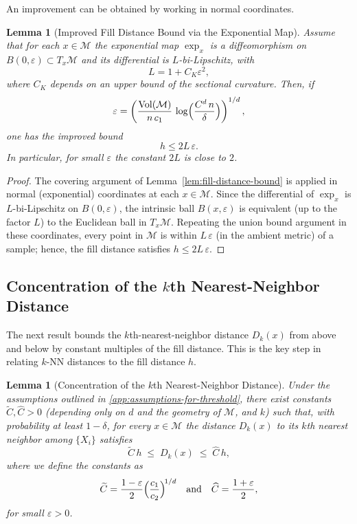 \documentclass{article}
\theoremstyle{plain}
\newtheorem{lemma}[theorem]{Lemma}
\theoremstyle{definition}
\theoremstyle{remark}
\begin{document}
\medskip

An improvement can be obtained by working in normal coordinates.

\begin{lemma}[Improved Fill Distance Bound via the Exponential Map]\label{lem:fill-distance-bound-improved}
Assume that for each \(x\in \mathcal{M}\) the exponential map \(\exp_x\) is a diffeomorphism on \(B(0,\varepsilon)\subset T_x\mathcal{M}\) and its differential is \(L\)-bi-Lipschitz, with 
\[
L = 1+C_K\varepsilon^2,
\]
where \(C_K\) depends on an upper bound of the sectional curvature. Then, if 
\[
\varepsilon = \left(\frac{\operatorname{Vol}(\mathcal{M})}{n\,c_1}\,\log\Bigl(\frac{C^d\,n}{\delta}\Bigr)\right)^{1/d},
\]
one has the improved bound
\begin{equation}\label{eq:fill-distance-bound-improved}
h \le 2L\,\varepsilon.
\end{equation}
In particular, for small \(\varepsilon\) the constant \(2L\) is close to \(2\).
\end{lemma}

\begin{proof}
The covering argument of Lemma~\ref{lem:fill-distance-bound} is applied in normal (exponential) coordinates at each \(x\in \mathcal{M}\). Since the differential of \(\exp_x\) is \(L\)-bi-Lipschitz on \(B(0,\varepsilon)\), the intrinsic ball \(B(x,\varepsilon)\) is equivalent (up to the factor \(L\)) to the Euclidean ball in \(T_x\mathcal{M}\). Repeating the union bound argument in these coordinates, every point in \(\mathcal{M}\) is within \(L\,\varepsilon\) (in the ambient metric) of a sample; hence, the fill distance satisfies
\(h\le 2L\,\varepsilon.\)
\end{proof}


\subsection{Concentration of the \(k\)th Nearest-Neighbor Distance}

The next result bounds the $k$th-nearest-neighbor distance $D_k(x)$ from above and below by constant multiples of the fill distance. This is the key step in relating $k$-NN distances to the fill distance $h$.

\begin{lemma}[Concentration of the \texorpdfstring{$k$}{k}th Nearest-Neighbor Distance]
\label{lem:nn-concentration}
Under the assumptions outlined in \ref{app:assumptions-for-threshold}, there exist constants $\widetilde{C},\widehat{C} > 0$ (depending only on $d$ and the geometry of $\mathcal{M}$, and $k$) such that, with probability at least $1-\delta$, for every $x\in\mathcal{M}$ the distance $D_k(x)$ to its $k$th nearest neighbor among $\{X_i\}$ satisfies
\[
\widetilde{C}\,h \;\le\; D_k(x) \;\le\; \widehat{C}\,h,
\]
where we define the constants as
\[
\widetilde{C} = \frac{1-\varepsilon}{2}\Bigl(\frac{c_1}{c_2}\Bigr)^{\!1/d}
\quad\text{and}\quad
\widehat{C} = \frac{1+\varepsilon}{2},
\] 
for small $\varepsilon>0$.
\end{lemma}
\end{document}

